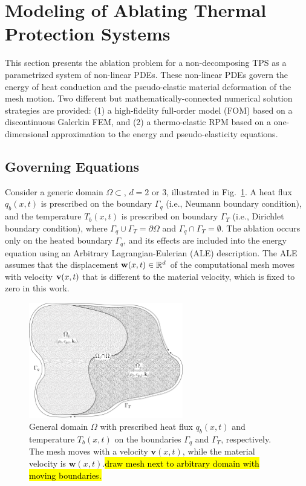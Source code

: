 \section{Modeling of Ablating Thermal Protection Systems}

This section presents the ablation problem for a non-decomposing TPS as a parametrized system of non-linear PDEs. These non-linear PDEs govern the energy of heat conduction and the pseudo-elastic material deformation of the mesh motion. Two different but mathematically-connected numerical solution strategies are provided: (1) a high-fidelity full-order model (FOM) based on a discontinuous Galerkin FEM, and (2) a thermo-elastic RPM based on a one-dimensional approximation to the energy and pseudo-elasticity equations.

\subsection{Governing Equations}\label{sec_governing_equations}

Consider a generic domain $\Omega\subset$, $d=2$ or $3$, illustrated in Fig.~\ref{fig_general_domain}. A heat flux $q_b(x,t)$ is prescribed on the boundary $\Gamma_q$ (i.e., Neumann boundary condition), and the temperature $T_b(x,t)$ is prescribed on boundary $\Gamma_T$ (i.e., Dirichlet boundary condition), where $\Gamma_q\cup\Gamma_T = \partial\Omega$ and $\Gamma_q\cap\Gamma_T = \emptyset$. The ablation occurs only on the heated boundary $\Gamma_q$, and its effects are included into the energy equation using an Arbitrary Lagrangian-Eulerian (ALE) description. The ALE assumes that the displacement $\mathbf{w}(x,t)\in\mathbb{R}^d$ of the computational mesh moves with velocity $\mathbf{v}(x,t)$ that is different to the material velocity, which is fixed to zero in this work.

\begin{figure}
    \centering
    \includegraphics[width=0.6\textwidth]{./figs/general_domain.png}
    \caption{General domain $\Omega$ with prescribed heat flux $q_b(x,t)$ and temperature $T_b(x,t)$ on the boundaries $\Gamma_q$ and $\Gamma_T$, respectively. The mesh moves with a velocity $\mathbf{v}(x,t)$, while the material velocity is $\mathbf{w}(x,t)$.\hl{draw mesh next to arbitrary domain with moving boundaries.}}
    \label{fig_general_domain}
\end{figure}

